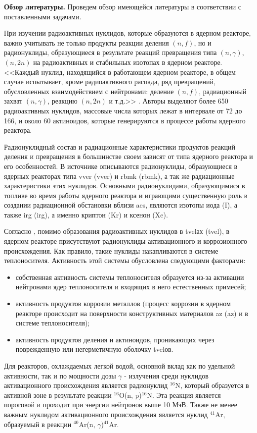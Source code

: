 \textbf{Обзор литературы.} Проведем обзор имеющейся литературы в соответствии с поставленными задачами.

При изучении радиоактивных нуклидов, которые образуются в ядерном реакторе, важно учитывать не только продукты реакции 
деления $(n, f)$, но и радионуклиды, образующиеся в результате реакций превращения типа $(n, \gamma)$, $(n, 2n)$ на 
радиоактивных и стабильных изотопах в ядерном реакторе. <<Каждый нуклид, находящийся в работающем ядерном реакторе, в 
общем случае испытывает, кроме радиоактивного распада, ряд превращений, обусловленных взаимодействием с нейтронами: 
деление $(n, f)$, радиационный захват $(n, \gamma)$, реакцию $(n, 2n)$ и т.д.>> \citep[с.~6]{kolobashkin}.  
Авторы \cite{kolobashkin} выделяют более 650 радиоактивных нуклидов, массовые числа которых лежат в интервале от 72 до 
166, и около 60 актиноидов, которые генерируются в процессе работы ядерного реактора.

Радионуклидный состав и радиационные характеристики продуктов реакций деления и превращения в большинстве своем зависят 
от типа ядерного реактора и его особенностей. В источнике \cite{gusev_bio} описываются радионуклиды, образующиеся в 
ядерных реакторах типа \ac{vver} (\acl{vver}) и \ac{rbmk} (\acl{rbmk}), а так же радиационные характеристики этих 
нуклидов. Основными радионуклидами, образующимися в топливе во время работы ядерного реактора и играющими существенную 
роль в создании радиационной обстановки вблизи \ac{aes}, являются изотопы иода (I), а также \ac{irg} (\acl{irg}), а 
именно криптон (Kr) и ксенон (Xe).

Согласно \cite{gusev_bio, gusev_def, egorov}, помимо образования радиоактивных нуклидов в \ac{tvel}ах (\acl{tvel}), 
в ядерном реакторе присутствуют радионуклиды активационного и коррозионного происхождения. Как правило, такие нуклиды 
накапливаются в системе теплоносителя. Активность этой системы обусловлена следующими факторами:

\begin{itemize}
	\item собственная активность системы теплоносителя образуется из-за активации нейтронами ядер теплоносителя и 
		входящих в него естественных примесей;
	\item активность продуктов коррозии металлов (процесс коррозии в ядерном реакторе происходит на поверхности 
		конструктивных материалов \ac{az} (\acl{az}) и в системе теплоносителя);
	\item активность продуктов деления и актиноидов, проникающих через поврежденную или негерметичную оболочку 
		\ac{tvel}ов.
\end{itemize}
Для реакторов, охлаждаемых легкой водой, основной вклад как по удельной активности, так и по мощности дозы $\gamma$ - 
излучения среди нуклидов активационного происхождения является радионуклид $^{16}\text{N}$, который образуется в
активной зоне в результате реакции $^{16}\text{O}$(n, p)$^{16}\text{N}$. Эта реакция является 
пороговой и проходит при энергии нейтронов выше 10 МэВ. Также не менее важным нуклидом активационного происхождения 
является нуклид $^{41}\text{Ar}$, образуемый в реакции $^{40}\text{Ar}$(n, $\gamma$)$^{41}\text{Ar}$.

